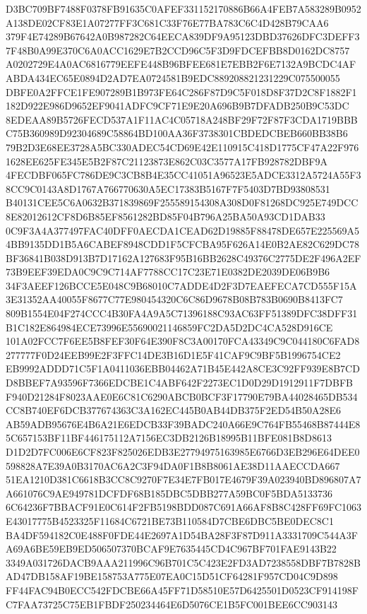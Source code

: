 \documentclass[UTF8,fontset=fandol,zihao=-4,a4paper]{ctexart}
\begin{document}
{{D3BC709BF7488F0378FB91635C0AFEF331152170886B66A4FEB7A583289B0952A138DE02CF83E1A07277FF3C681C33F76E77BA783C6C4D428B79CAA6
379F4E74289B67642A0B987282C64EECA839DF9A95123DBD37626DFC3DEFF37F48B0A99E370C6A0ACC1629E7B2CCD96C5F3D9FDCEFBB8D0162DC8757
A0202729E4A0AC6816779EEFE448B96BFEE681E7EBB2F6E7132A9BCDC4AFABDA434EC65E0894D2AD7EA0724581B9EDC889208821231229C075500055
DBFE0A2FFCE1FE907289B1B973FE64C286F87D9C5F018D8F37D2C8F1882F1182D922E986D9652EF9041ADFC9CF71E9E20A696B9B7DFADB250B9C53DC
8EDEAA89B5726FECD537A1F11AC4C05718A248BF29F72F87F3CDA1719BBBC75B360989D92304689C58864BD100AA36F3738301CBDEDCBEB660BB38B6
79B2D3E68EE3728A5BC330ADEC54CD69E42E110915C418D1775CF47A22F9761628EE625FE345E5B2F87C21123873E862C03C3577A17FB928782DBF9A
4FECDBF065FC786DE9C3CB8B4E35CC41051A96523E5ADCE3312A5724A55F38CC9C0143A8D1767A766770630A5EC17383B5167F7F5403D7BD93808531
B40131CEE5C6A0632B371839869F255589154308A308D0F81268DC925E749DCC8E82012612CF8D6B85EF8561282BD85F04B796A25BA50A93CD1DAB33
0C9F3A4A377497FAC40DFF0AECDA1CEAD62D19885F88478DE657E225569A54BB9135DD1B5A6CABEF8948CDD1F5CFCBA95F626A14E0B2AE82C629DC78
BF36841B038D913B7D17162A127683F95B16BB2628C49376C2775DE2F496A2EF73B9EEF39EDA0C9C9C714AF7788CC17C23E71E0382DE2039DE06B9B6
34F3AEEF126BCCE5E048C9B68010C7ADDE4D2F3D7EAEFECA7CD555F15A3E31352AA40055F8677C77E980454320C6C86D9678B08B783B0690B8413FC7
809B1554E04F274CCC4B30FA4A9A5C71396188C93AC63FF51389DFC38DFF31B1C182E864984ECE73996E55690021146859FC2DA5D2DC4CA528D916CE
101A02FCC7F6EE5B8FEF30F64E390F8C3A00170FCA43349C9C044180C6FAD8277777F0D24EEB99E2F3FFC14DE3B16D1E5F41CAF9C9BF5B1996754CE2
EB9992ADDD71C5F1A0411036EBB04462A71B45E442A8CE3C92FF939E8B7CDD8BBEF7A93596F7366EDCBE1C4ABF642F2273EC1D0D29D1912911F7DBFB
F940D21284F8023AAE0E6C81C6290ABCB0BCF3F17790E79BA44028465DB534CC8B740EF6DCB377674363C3A162EC445B0AB44DB375F2ED54B50A28E6
AB59ADB95676E4B6A21E6EDCB33F39BADC240A66E9C764FB55468B87444E85C657153BF11BF446175112A7156EC3DB2126B18995B11BFE081B8D8613
D1D2D7FC006E6CF823F825026EDB3E27794975163985E6766D3EB296E64DEE0598828A7E39A0B3170AC6A2C3F94DA0F1B8B8061AE38D11AAECCDA667
51EA1210D381C6618B3CC8C9270F7E34E7FB017E4679F39A023940BD896807A7A661076C9AE949781DCFDF68B185DBC5DBB277A59BC0F5BDA5133736
6C64236F7BBACF91E0C614F2FB5198BDD087C691A66AF8B8C428FF69FC1063E43017775B4523325F11684C6721BE73B110584D7CBE6DBC5BE0DEC8C1
BA4DF594182C0E488F0FDE44E2697A1D54BA28F3F87D911A3331709C544A3FA69A6BE59EB9ED506507370BCAF9E7635445CD4C967BF701FAE9143B22
3349A031726DACB9AAA211996C96B701C5C423E2FD3AD7238558DBF7B7828BAD47DB158AF19BE158753A775E07EA0C15D51CF64281F957CD04C9D898
FF44FAC94B0ECC542FDCBE66A45FF71D58510E57D6425501D0523CF914198FC7FAA73725C75EB1FBDF250234464E6D5076CE1B5FC001BEE6CC903143
}}
\end{document}
